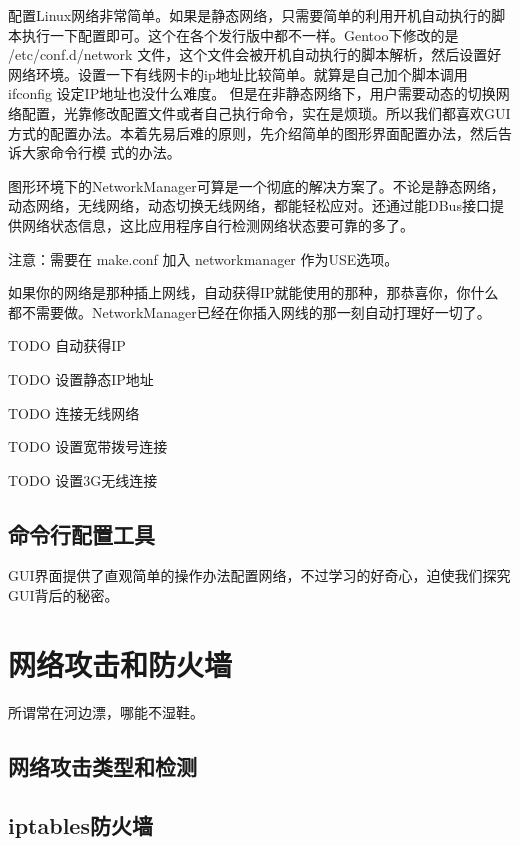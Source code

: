 配置Linux网络非常简单。如果是静态网络，只需要简单的利用开机自动执行的脚本执行一下配置即可。这个在各个发行版中都不一样。Gentoo下修改的是 /etc/conf.d/network 文件，这个文件会被开机自动执行的脚本解析，然后设置好网络环境。设置一下有线网卡的ip地址比较简单。就算是自己加个脚本调用 ifconfig 设定IP地址也没什么难度。
但是在非静态网络下，用户需要动态的切换网络配置，光靠修改配置文件或者自己执行命令，实在是烦琐。所以我们都喜欢GUI方式的配置办法。本着先易后难的原则，先介绍简单的图形界面配置办法，然后告诉大家命令行模
式的办法。

图形环境下的NetworkManager可算是一个彻底的解决方案了。不论是静态网络，动态网络，无线网络，动态切换无线网络，都能轻松应对。还通过能DBus接口提供网络状态信息，这比应用程序自行检测网络状态要可靠的多了。
\begin{notice}
注意：需要在 make.conf 加入 networkmanager 作为USE选项。
\end{notice}

如果你的网络是那种插上网线，自动获得IP就能使用的那种，那恭喜你，你什么都不需要做。NetworkManager已经在你插入网线的那一刻自动打理好一切了。

TODO 自动获得IP

TODO 设置静态IP地址

TODO 连接无线网络

TODO 设置宽带拨号连接

TODO 设置3G无线连接


\subsection{命令行配置工具}

GUI界面提供了直观简单的操作办法配置网络，不过学习的好奇心，迫使我们探究GUI背后的秘密。

\section{网络攻击和防火墙}

所谓常在河边漂，哪能不湿鞋。

\subsection{网络攻击类型和检测}
\subsection{iptables防火墙}

